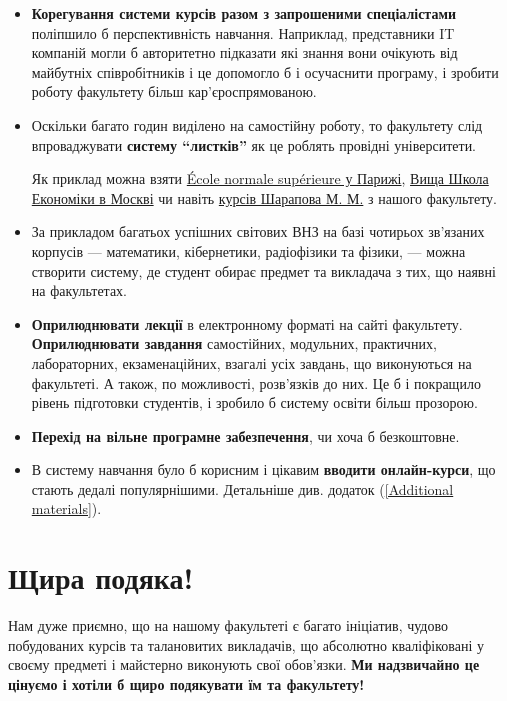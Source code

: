 \documentclass[14pt, a4paper]{extarticle}  %
\begin{document}
\begin{itemize}
    \item  \textbf{Корегування системи курсів разом з  запрошеними спеціалістами} поліпшило б перспективність навчання. Наприклад, представники IT компаній могли б авторитетно підказати які знання вони очікують від майбутніх співробітників і це допомогло б і осучаснити програму, і зробити роботу факультету більш кар'єроспрямованою.
    
    \item Оскільки багато годин виділено на самостійну роботу, то факультету слід впроваджувати \textbf{систему ``листків''} як це роблять провідні університети. 
    
    Як приклад можна взяти \href{https://www.math.ens.fr/enseignement/fiche_cours.html?cours=201}{École normale supérieure у Парижі}, \href{https://math.hse.ru/bac3/4-pma-13}{Вища Школа Економіки в Москві} чи навіть \href{http://teorver.pp.ua/ukr/ukr.php?templ=tv1}{курсів Шарапова М. М.} з нашого факультету.  
    
    \item За прикладом багатьох успішних світових ВНЗ на базі чотирьох зв'язаних корпусів --- математики, кібернетики, радіофізики та фізики, --- можна створити систему, де студент обирає предмет та викладача з тих, що наявні на факультетах.%
    
    \item  \textbf{Оприлюднювати лекції} в електронному форматі на сайті факультету.
     \textbf{Оприлюднювати завдання} самостійних, модульних, практичних, лабораторних, екзаменаційних, взагалі усіх завдань, що виконуються на факультеті. А також, по можливості, розв'язків до них. Це б і покращило рівень підготовки студентів, і зробило б систему освіти більш прозорою. 
    
    \item \textbf{Перехід на вільне програмне забезпечення}, чи хоча б безкоштовне.
    
    \item В систему навчання було б корисним і цікавим \textbf{вводити онлайн-курси}, що стають дедалі популярнішими. Детальніше див. додаток (\ref{Additional materials}).
\end{itemize}

\newpage
\section{Щира подяка!}
Нам дуже приємно, що на нашому факультеті є багато ініціатив, чудово побудованих курсів та талановитих викладачів, що абсолютно кваліфіковані у своєму предметі і майстерно виконують свої обов'язки. \textbf{Ми надзвичайно це цінуємо і хотіли б щиро подякувати їм та факультету! }\medskip
\end{document}
